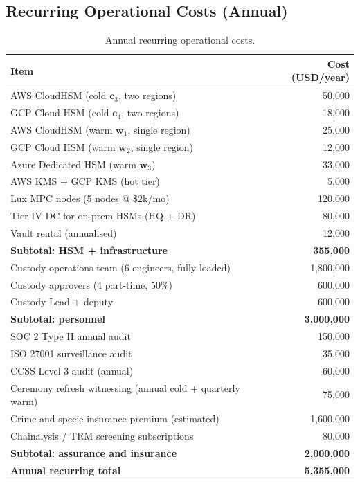 \subsection{Recurring Operational Costs (Annual)}

\begin{table}[h]
\centering
\small
\begin{tabular}{lr}
\toprule
\textbf{Item} & \textbf{Cost (USD/year)} \\
\midrule
AWS CloudHSM (cold $\mathbf{c}_3$, two regions) & 50{,}000 \\
GCP Cloud HSM (cold $\mathbf{c}_4$, two regions) & 18{,}000 \\
AWS CloudHSM (warm $\mathbf{w}_1$, single region) & 25{,}000 \\
GCP Cloud HSM (warm $\mathbf{w}_2$, single region) & 12{,}000 \\
Azure Dedicated HSM (warm $\mathbf{w}_3$) & 33{,}000 \\
AWS KMS + GCP KMS (hot tier) & 5{,}000 \\
Lux MPC nodes (5 nodes @ \$2k/mo) & 120{,}000 \\
Tier IV DC for on-prem HSMs (HQ + DR) & 80{,}000 \\
Vault rental (annualised) & 12{,}000 \\
\textbf{Subtotal: HSM + infrastructure} & \textbf{355{,}000} \\
\midrule
Custody operations team (6 engineers, fully loaded) & 1{,}800{,}000 \\
Custody approvers (4 part-time, 50\%) & 600{,}000 \\
Custody Lead + deputy & 600{,}000 \\
\textbf{Subtotal: personnel} & \textbf{3{,}000{,}000} \\
\midrule
SOC 2 Type II annual audit & 150{,}000 \\
ISO 27001 surveillance audit & 35{,}000 \\
CCSS Level 3 audit (annual) & 60{,}000 \\
Ceremony refresh witnessing (annual cold + quarterly warm) & 75{,}000 \\
Crime-and-specie insurance premium (estimated) & 1{,}600{,}000 \\
Chainalysis / TRM screening subscriptions & 80{,}000 \\
\textbf{Subtotal: assurance and insurance} & \textbf{2{,}000{,}000} \\
\midrule
\textbf{Annual recurring total} & \textbf{5{,}355{,}000} \\
\bottomrule
\end{tabular}
\caption{Annual recurring operational costs.}
\label{tab:opex}
\end{table}

